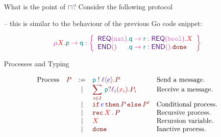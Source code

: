\begin{frame}{What is the point of $\lmerge$?}
  Consider the following protocol

  -- {\small this is similar to the behaviour of the previous Go code snippet:}

  \begin{displaymath}
    \grecur X {
\gmsg \Rp \Rq {\left\{%
  \begin{array}{l@{}l}
   \dlbl{\mathsf{REQ}}(\snat) &. \gmsg \Rq \Rr {\dlbl{\mathsf{REQ}}(\sbool). \pvar{X}} \\
   \dlbl{\mathsf{END}}() &. \gmsg \Rq \Rr {\dlbl{\mathsf{END}}(). \pfinish}
  \end{array}
   \right\}}}
  \end{displaymath}

  \vspace{1cm}

\end{frame}


\begin{frame}{Processes and Typing}

\begin{displaymath}
  \begin{array}{lrcll}
    \text{Process} & \proc{P} & \mathrel{:=} & \psend p \lbl e P & \text{Send a message.} \\
    & & \mid & \precv i I {\precbr p {\lbl_i} {x_i} {P_i}} & \text{Receive a message.} \\
    & & \mid & \pif e P {P'} & \text{Conditional process.} \\
    & & \mid & \precur X P & \text{Recursive process.} \\
    & & \mid & \pvar X & \text{Recursion variable.} \\
    & & \mid & \pfinish & \text{Inactive process.} \\
  \end{array}
\end{displaymath}

\end{frame}

